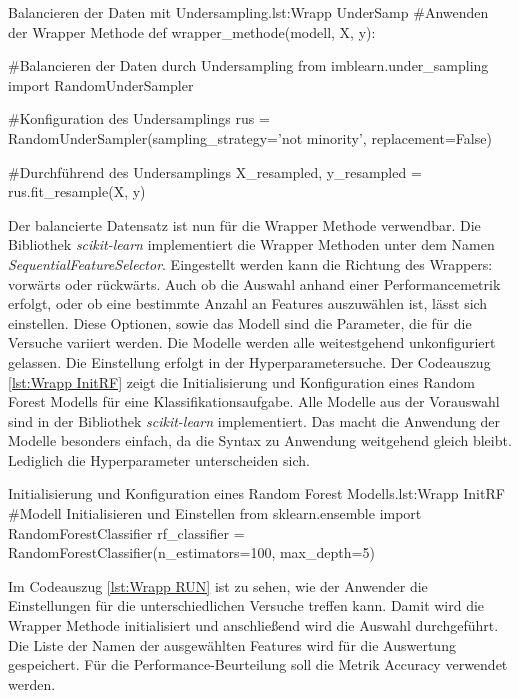 \begin{pythoncode}{Balancieren der Daten mit Undersampling.}{lst:Wrapp UnderSamp}
#Anwenden der Wrapper Methode
def wrapper_methode(modell, X, y):

    #Balancieren der Daten durch Undersampling
    from imblearn.under_sampling import RandomUnderSampler

    #Konfiguration des Undersamplings
    rus = RandomUnderSampler(sampling_strategy='not minority', 
                             replacement=False)
    
    #Durchführend des Undersamplings
    X_resampled, y_resampled = rus.fit_resample(X, y)

\end{pythoncode}

Der balancierte Datensatz ist nun für die Wrapper Methode verwendbar. Die Bibliothek \textit{scikit-learn} implementiert die Wrapper Methoden unter dem Namen \textit{SequentialFeatureSelector}. Eingestellt werden kann die Richtung des Wrappers: vorwärts oder rückwärts. Auch ob die Auswahl anhand einer Performancemetrik erfolgt, oder ob eine bestimmte Anzahl an Features auszuwählen ist, lässt sich einstellen. Diese Optionen, sowie das Modell sind die Parameter, die für die Versuche variiert werden. Die Modelle werden alle weitestgehend unkonfiguriert gelassen. Die Einstellung erfolgt in der Hyperparametersuche. Der Codeauszug \ref{lst:Wrapp InitRF} zeigt die Initialisierung und Konfiguration eines Random Forest Modells für eine Klassifikationsaufgabe. Alle Modelle aus der Vorauswahl sind in der Bibliothek \textit{scikit-learn} implementiert. Das macht die Anwendung der Modelle besonders einfach, da die Syntax zu Anwendung weitgehend gleich bleibt. Lediglich die Hyperparameter unterscheiden sich. 

\begin{pythoncode}{Initialisierung und Konfiguration eines Random Forest Modells.}{lst:Wrapp InitRF}
#Modell Initialisieren und Einstellen
from sklearn.ensemble import RandomForestClassifier
rf_classifier = RandomForestClassifier(n_estimators=100, 
                                       max_depth=5)
\end{pythoncode}

Im Codeauszug \ref{lst:Wrapp RUN} ist zu sehen, wie der Anwender die Einstellungen für die unterschiedlichen Versuche treffen kann. Damit wird die Wrapper Methode initialisiert und anschließend wird die Auswahl durchgeführt. Die Liste der Namen der ausgewählten Features wird für die Auswertung gespeichert. Für die Performance-Beurteilung soll die Metrik Accuracy verwendet werden.

